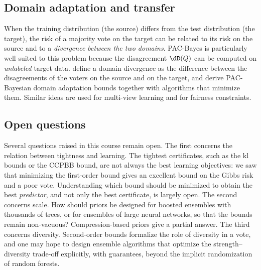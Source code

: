 \subsection{Domain adaptation and transfer}

When the training distribution (the source) differs from the test distribution
(the target), the risk of a majority vote on the target can be related to its
risk on the source and to a \emph{divergence between the two domains}. PAC-Bayes
is particularly well suited to this problem because the disagreement $\dD(Q)$
can be computed on \emph{unlabeled} target data.
\citet{germain2013pac,germain2020pac} define a domain divergence as the difference
between the disagreements of the voters on the source and on the target, and
derive PAC-Bayesian domain adaptation bounds together with algorithms that
minimize them. Similar ideas are used for multi-view learning and for fairness
constraints.

\subsection{Open questions}

Several questions raised in this course remain open. The first concerns the
relation between tightness and learning. The tightest certificates, such as the
kl bounds or the CCPBB bound, are not always the best learning objectives: we
saw that minimizing the first-order bound gives an excellent bound on the Gibbs
risk and a poor vote. Understanding which bound should be minimized to obtain
the best \emph{predictor}, and not only the best certificate, is largely open.
The second concerns scale. How should priors be designed for boosted ensembles
with thousands of trees, or for ensembles of large neural networks, so that the
bounds remain non-vacuous? Compression-based priors \citep{lotfi2022pac} give a
partial answer. The third concerns diversity. Second-order bounds formalize the
role of diversity in a vote, and one may hope to design ensemble algorithms that
optimize the strength--diversity trade-off explicitly, with guarantees, beyond
the implicit randomization of random forests.

